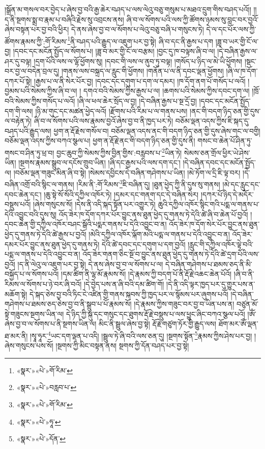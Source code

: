 །སྒྲོན་མ་གསལ་བར་བྱེད་པ་ཞེས་བྱ་བའི་རྒྱ་ཆེར་བཤད་པ་ལས་ལེའུ་བཅུ་གསུམ་པ་མཐའ་དྲུག་གིས་བཤད་པའོ།། །།ད་ནི་སྔགས་སྨྲ་བ་རྣམ་པ་བཞིའི་རྗེས་སུ་འབྲངས་ནས། ཞི་བ་ལ་སོགས་པའི་ལས་ཀྱི་ཚོགས་ཉམས་སུ་བླང་བར་བྱའོ་ཞེས་བསྟན་པར་བྱ་བའི་ཕྱིར། དེ་ནས་ཞེས་བྱ་བ་ལ་སོགས་པ་ལེའུ་བཅུ་བཞི་པ་གསུངས་ཏེ། དེ་ལ་དང་པོར་ལས་ཀྱི་ཚོགས་རྣམས་ཀྱི་:གོ་རིམས་\footnote{«སྣར་»«པེ་»གོ་རིམ་}ནི་བཤད་པའི་རྒྱུད་ལ་འཇུག་པར་བྱ་སྟེ། ཞི་བ་དང་ནི་རྒྱས་པ་དག །ཟླ་བ་ཡར་གྱི་ངོ་ལ་བྱ། །དབང་དང་མངོན་སྤྱོད་ལ་སོགས་པ། །ཟླ་བ་མར་གྱི་ངོ་ལ་བརྩམ། །བྱང་དུ་ཁ་བལྟས་ཞི་བ་ལ། །དེ་བཞིན་རྒྱས་ལ་ཤར་དུ་བལྟ། །དྲག་པོའི་ལས་ལ་ལྷོ་ཕྱོགས་སུ། །དབང་གི་ལས་ལ་ནུབ་ཏུ་བལྟ། །གསོད་པ་ཉིད་ལ་མེ་ཡི་ཕྱོགས། །སྡང་བར་བྱ་ལ་བདེན་བྲལ་དུ། །གནས་ལས་བསྐྲད་ལ་རླུང་གི་ཕྱོགས། །གནོན་པ་ལ་ནི་དབང་ལྡན་ཕྱོགས། །ཞི་ལ་ཁ་དོག་དཀར་པོ་སྟེ། །རྒྱས་པ་ལ་ནི་སེར་པོར་བྱ། །དབང་དང་དགུག་པ་དག་ལ་དམར། །ཁ་དོག་ནག་པོ་གསོད་པ་ལའོ། །བྱམས་པའི་སེམས་ཀྱིས་ཞི་བ་ལ། །
དགའ་བའི་སེམས་ཀྱིས་རྒྱས་པ་ལ། །ཆགས་པའི་སེམས་ཀྱིས་དབང་དག་ལ། །ཁྲོ་བའི་སེམས་ཀྱིས་གསོད་པ་ལའོ། །ཞི་ལ་ཕལ་ཆེར་སྲོད་ལ་བྱ། །དེ་བཞིན་རྒྱས་པ་སྔ་དྲོ་བྱ། །དབང་དང་མངོན་སྤྱོད་དག་གི་ལས། །ཉི་མ་གུང་དང་མཚན་ཕྱེད་ལའོ། །རྫོགས་པའི་རིམ་པ་ལ་གནས་པས། །ནང་གི་བདག་ཉིད་ཅན་གྱི་དུས་ལ་བརྟེན་ཏེ། ཞི་བ་ལ་སོགས་པའི་ལས་རྣམས་བྱའོ་ཞེས་བྱ་བ་ནི་ཁྱད་པར་ཏེ། བཅོམ་ལྡན་འདས་ཀྱིས་ཇི་སྐད་དུ་བཤད་པའི་རྒྱུད་ལས། ཕྱག་ན་རྡོ་རྗེས་གསོལ་བ། བཅོམ་ལྡན་འདས་ནང་གི་བདག་ཉིད་ཅན་གྱི་དུས་ཞེས་གང་ལ་བགྱི། བཅོམ་ལྡན་འདས་ཀྱིས་བཀའ་སྩལ་པ། ཕྱག་ན་རྡོ་རྗེ་ནང་གི་བདག་ཉིད་ཅན་གྱི་དུས་ནི། གསང་བ་ཆེན་པོ་ཤིན་ཏུ་གསང་བ་ཤིན་ཏུ་ཕྲ་བ། བྱང་ཆུབ་ཀྱི་སེམས་ཀྱིས་བྱིན་གྱིས་:བརླབས་པ་\footnote{«སྣར་»«པེ་»བརླབ་པ་}ཡིན་ཏེ། སེམས་ཅན་གྲོལ་ཕྱིར་ཡེ་ཤེས་ཡིན། །སྔགས་རྣམས་སྒྲུབ་ལ་དངོས་གྲུབ་ཡིན། །ཞི་དང་རྒྱས་པའི་ལས་དག་དང་། །དེ་བཞིན་དབང་དང་མངོན་སྤྱོད་ལ། །བཅོམ་ལྡན་གཟུང་མིན་ཞི་བ་སྟེ། །སེམས་དབྱིངས་དེ་བཞིན་གཤེགས་པ་ཡིན། །མེ་ཏོག་ལ་དྲི་ཇི་ལྟ་བར། །དེ་བཞིན་འགྲོ་བའི་སྙིང་ལ་གནས། །རིམ་ནི་:གོ་རིམས་\footnote{«སྣར་»«པེ་»གོ་རིམ་}ཇི་བཞིན་དུ། །ཐུན་ཕྱེད་ཀྱི་ནི་དུས་སུ་གནས། །མེ་དང་རླུང་དང་དབང་ཆེན་དང་། །ཆུ་སྟེ་སོ་སོའི་དཀྱིལ་འཁོར་ཏེ། །དམར་དང་གནག་དང་དེ་བཞིན་སེར། །དཀར་པོ་ཉིད་དེ་མདོར་བསྡུས་པའོ། །ཞེས་གསུངས་སོ། །དེས་ནི་འདི་སྐད་སྟོན་པར་འགྱུར་ཏེ། ཆུའི་དཀྱིལ་འཁོར་སྙིང་གའི་པདྨ་ལ་གནས་པ་དེའི་འབྱུང་བའི་དུས་སུ། འོད་ཟེར་ཁ་དོག་དཀར་པོར་བྱུང་ནས་ཐུན་ཕྱེད་དུ་གནས་ཏེ་དེའི་ཚེ་ཞི་བ་ཆེན་པོ་བྱའོ། །དབང་ཆེན་གྱི་དཀྱིལ་འཁོར་བཤང་སྒོའི་པདྨར་གནས་པ་དེའི་འབྱུང་བ་ན། འོད་ཟེར་ཁ་དོག་སེར་པོར་བྱུང་ནས་ཐུན་ཕྱེད་དུ་གནས་ཏེ་དེའི་ཚེ་རྒྱས་པ་བྱའོ། །མེའི་དཀྱིལ་འཁོར་ལྐོག་མའི་པདྨ་ལ་གནས་པ་དེའི་འབྱུང་བ་ན། འོད་ཟེར་དམར་པོར་བྱུང་ནས་ཐུན་ཕྱེད་དུ་གནས་ཏེ། དེའི་ཚེ་དབང་དང་དགུག་པ་དག་བྱའོ། །རླུང་གི་དཀྱིལ་འཁོར་ལྟེ་བའི་པདྨ་ལ་གནས་པ་དེའི་འབྱུང་བ་ན། འོད་ཟེར་གནག་ཅིང་སྔོ་བ་བྱུང་ནས་ཐུན་ཕྱེད་དུ་གནས་ཏེ་དེའི་ཚེ་དྲག་པོའི་ལས་བྱའོ། །ད་ནི་ལེའུ་ལ་འཇུག་པར་བྱ་སྟེ། དེ་ནས་ཞེས་བྱ་བ་ལ་སོགས་པ་ལ། དེ་བཞིན་གཤེགས་པ་ཐམས་ཅད་ནི་མི་བསྐྱོད་པ་ལ་སོགས་པའོ། །དམ་ཚིག་ནི་ལྷ་མོ་རྣམས་སོ། །དེ་རྣམས་ཀྱི་བདག་པོ་ནི་རྡོ་རྗེ་འཆང་ཆེན་པོའོ། །ཞི་བ་ནི་རིམས་ལ་སོགས་པ་ཉེ་བར་ཞི་བའོ། །དེ་བྱེད་པས་ན་ཞི་བའི་དམ་ཚིག་གོ། །དེ་ནི་འདི་ལྟར་ཁྱད་པར་དུ་གྱུར་པས་ན་མཆོག་སྟེ། དེ་སྐད་ཅེས་བྱ་བའི་ཏིང་ངེ་འཛིན་གྱི་གནས་སྐབས་ཀྱི་ཁྱད་པར་ལ་སྙོམས་པར་ཞུགས་པའོ། །དེ་བཞིན་གཤེགས་པ་ཐམས་ཅད་ཅེས་བྱ་བ་ནི་སྒྲུབ་པ་པོ་རྣམས་སོ། །དེ་རྣམས་ཀྱིས་གཟུང་བར་བྱ་བ་ཡིན་པས་ན། བཙུན་མོ་སྟེ་གཟུངས་སྔགས་ཡིན་ལ། དེ་ཉིད་ཀྱི་སྐུ་དང་གསུང་དང་ཐུགས་རྡོ་རྗེ་བསྡུས་པ་ལས་ཕྱུང་ཞིང་བཀའ་སྩལ་པའོ། །ཨོཾ་ཞེས་བྱ་བ་ལ་སོགས་པ་ནི་སྔགས་ཡིན་ལ། མིང་ནི་སྦྲུལ་ཞེས་བྱ་སྟེ། རྡོ་རྗེ་གཙུག་ཏོར་གྱི་རྒྱུད་ལས། ཐོག་མར་ཨོཾ་ལྡན་ཐ་མར་ནི། །སྭཱ་ཧཱར་\footnote{«སྣར་»«པེ་»ཧཱ་}ཡང་དག་ལྡན་པ་འདི། །སྦྲུལ་ཏེ་ཞི་བའི་ལས་ཅན་དུ། །སྔགས་སྟོན་\footnote{«སྣར་»«པེ་»དོན་}རྣམས་ཀྱིས་ཤེས་པར་བྱ། །ཞེས་གསུངས་པས་སོ། །སྔགས་ཀྱི་མིང་བསྟན་ནས། སྔགས་ཀྱི་དོན་བཤད་པར་བྱ་སྟེ། 